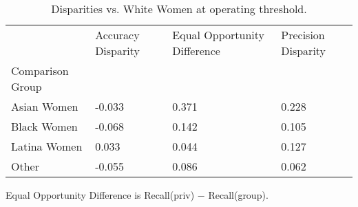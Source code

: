 \begin{table}[htbp]
\centering
\caption{Disparities vs. White Women at operating threshold.}
\label{tab:08-disparities}
\begin{tabular}{llll}
\toprule
 & Accuracy Disparity & Equal Opportunity Difference & Precision Disparity \\
Comparison Group &  &  &  \\
\midrule
Asian Women & -0.033 & 0.371 & 0.228 \\
Black Women & -0.068 & 0.142 & 0.105 \\
Latina Women & 0.033 & 0.044 & 0.127 \\
Other & -0.055 & 0.086 & 0.062 \\
\bottomrule
\end{tabular}

\begin{tablenotes}[flushleft]
\item \small{Equal Opportunity Difference is Recall(priv) − Recall(group).}
\end{tablenotes}
\end{table}